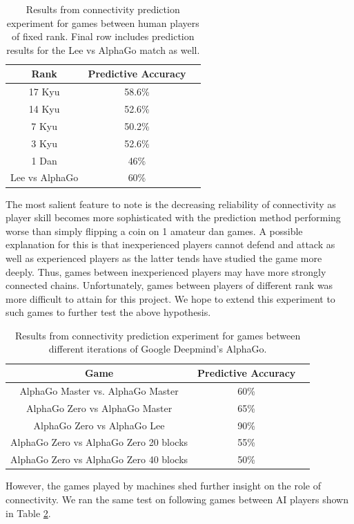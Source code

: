 \documentclass[11pt]{article}
\begin{document}
\begin{table}[ht]
    \centering
  \begin{tabular}{|c | c | c|}
      \hline
      Rank & Predictive Accuracy \\
      \hline
      17 Kyu & 58.6\% \\
      \hline
      14 Kyu & 52.6\% \\
            \hline
      7 Kyu &  50.2\% \\
            \hline
      3 Kyu & 52.6\% \\
            \hline
      1 Dan & 46\% \\
            \hline
      Lee vs AlphaGo & 60\% \\
            \hline

      \end{tabular}
      \caption{Results from connectivity prediction experiment for games between human players of fixed rank. Final row includes prediction results for the Lee vs AlphaGo match as well.}
      \label{tab:exp}
\end{table}

The most salient feature to note is the decreasing reliability of connectivity as player skill becomes more sophisticated with the prediction method performing worse than simply flipping a coin on 1 amateur dan games. A possible explanation for this is that inexperienced players cannot defend and attack as well as experienced players as the latter tends have studied the game more deeply. Thus, games between inexperienced players may have more strongly connected chains. Unfortunately, games between players of different rank was more difficult to attain for this project. We hope to extend this experiment to such games to further test the above hypothesis.
\begin{table}[ht]
    \centering
  \begin{tabular}{|c | c | c|}
      \hline
      Game & Predictive Accuracy \\
      \hline
      AlphaGo Master vs. AlphaGo Master & 60\% \\
      \hline
      AlphaGo Zero vs AlphaGo Master & 65\% \\
            \hline
      AlphaGo Zero vs AlphaGo Lee &  90\% \\
            \hline
      AlphaGo Zero vs AlphaGo Zero 20 blocks & 55\% \\
            \hline
      AlphaGo Zero vs AlphaGo Zero 40 blocks & 50\% \\
            \hline
      \end{tabular}
      \caption{Results from connectivity prediction experiment for games between different iterations of Google Deepmind's AlphaGo.}
      \label{tab:mexp}
\end{table}
However, the games played by machines shed further insight on the role of connectivity. We ran the same test on following games between AI players shown in Table \ref{tab:mexp}.
\end{document}
